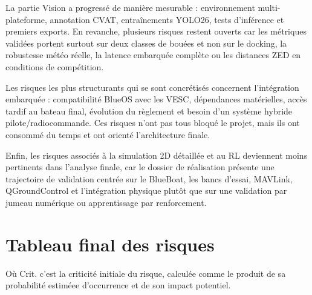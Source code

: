 \documentclass[11pt,letterpaper]{article}
\begin{document}
La partie Vision a progressé de manière mesurable : environnement multi-plateforme, annotation CVAT, entraînements YOLO26, tests d'inférence et premiers exports. En revanche, plusieurs risques restent ouverts car les métriques validées portent surtout sur deux classes de bouées et non sur le docking, la robustesse météo réelle, la latence embarquée complète ou les distances ZED en conditions de compétition.

Les risques les plus structurants qui se sont concrétisés concernent l'intégration embarquée : compatibilité BlueOS avec les VESC, dépendances matérielles, accès tardif au bateau final, évolution du règlement et besoin d'un système hybride pilote/radiocommande. Ces risques n'ont pas tous bloqué le projet, mais ils ont consommé du temps et ont orienté l'architecture finale.

Enfin, les risques associés à la simulation 2D détaillée et au RL deviennent moins pertinents dans l'analyse finale, car le dossier de réalisation présente une trajectoire de validation centrée sur le BlueBoat, les bancs d'essai, MAVLink, QGroundControl et l'intégration physique plutôt que sur une validation par jumeau numérique ou apprentissage par renforcement.

\section{Tableau final des risques}

Où Crit. c'est la criticité initiale du risque, calculée comme le produit de sa probabilité estiméee d'occurrence et de son impact potentiel.
 
\end{document}

